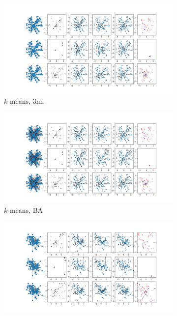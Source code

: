 \documentclass[a4paper,10pt]{article}
\begin{document}
\begin{figure}[htbp]
\begin{subfigure}{0.24\textwidth}
    \centering
    \includegraphics[trim={0 13.2cm 29.35cm 0},clip,width=\textwidth]{../results/pdfs/nn-100N-noemb-fixed}
    \caption{$k$-means, 3nn}
  \end{subfigure}
  \begin{subfigure}{0.24\textwidth}
    \centering
    \includegraphics[trim={0 13.2cm 29cm 0},clip,width=\textwidth]{../results/pdfs/ba-100N-noemb-fixed}
    \caption{$k$-means, BA}
  \end{subfigure}
  \begin{subfigure}{0.24\textwidth}
    \centering
    \includegraphics[trim={0 13.2cm 29cm 0},clip,width=\textwidth]{../results/pdfs/rn1-100N-noemb0}

\end{subfigure}
\end{figure}
\end{document}
